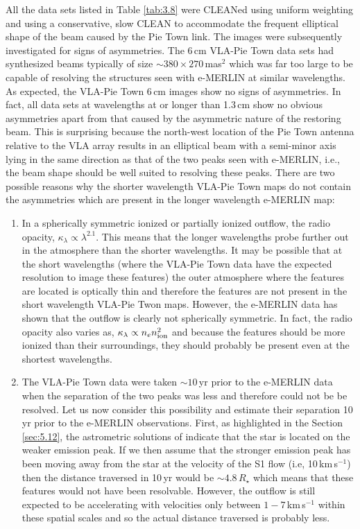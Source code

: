 All the data sets listed in Table \ref{tab:3.8} were CLEANed using uniform weighting and using a conservative, slow CLEAN to accommodate the frequent elliptical shape of the beam caused by the Pie Town link. The images were subsequently investigated for signs of asymmetries. The 6\,cm VLA-Pie Town data sets had synthesized beams typically of size $\sim 380\times 270$\,mas$^2$ which was far too large to be capable of resolving the structures seen with e-MERLIN at similar wavelengths. As expected, the VLA-Pie Town 6\,cm images show no signs of asymmetries. In fact, all data sets at wavelengths at or longer than 1.3\,cm show no obvious asymmetries apart from that caused by the asymmetric nature of the restoring beam. This is surprising because the north-west location of the Pie Town antenna relative to the VLA array results in an elliptical beam with a semi-minor axis lying in the same direction as that of the two peaks seen with e-MERLIN, i.e., the beam shape should be well suited to resolving these peaks. There are two possible reasons why the shorter wavelength VLA-Pie Town maps do not contain the asymmetries which are present in the longer wavelength e-MERLIN map:
\begin{enumerate}
\item In a spherically symmetric ionized or partially ionized outflow, the radio opacity, $\kappa _{\lambda} \propto \lambda ^{2.1}$. This means that the longer wavelengths probe further out in the atmosphere than the shorter wavelengths. It may be possible that at the short wavelengths (where the VLA-Pie Town data have the expected resolution to image these features) the outer atmosphere where the features are located is optically thin and therefore the features are not present in the short wavelength VLA-Pie Twon maps. However, the e-MERLIN data has shown that the outflow is clearly not spherically symmetric. In fact, the radio opacity also varies as, $\kappa _{\lambda} \propto n_{e}n_{\rm{ion}}^2$ and because the features should be more ionized than their surroundings, they should probably be present even at the shortest wavelengths.
\item The VLA-Pie Town data were taken $\sim 10$\,yr prior to the e-MERLIN data when the separation of the two peaks was less and therefore could not be be resolved. Let us now consider this possibility and estimate their separation  10\,yr prior to the e-MERLIN observations. First, as highlighted in the Section \ref{sec:5.12}, the astrometric solutions of \cite{harper_2008} indicate that the star is located on the weaker emission peak. If we then assume that the stronger emission peak has been moving away from the star at the velocity of the S1 flow (i.e, 10\,km\,s$^{-1}$) then the distance traversed in 10\,yr would be $\sim 4.8\,R_{\star}$ which means that these features would not have been resolvable. However, the outflow is still expected to be accelerating with velocities only between $1-7$\,km\,s$^{-1}$ within these spatial scales \citep{carpenter_1997} and so the actual distance traversed is probably less.
\end{enumerate}


